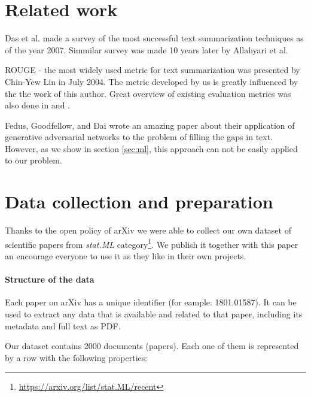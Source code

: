\documentclass[sigplan]{acmart}
\begin{document}

\section{Related work}

Das et al. made a survey of the most successful text summarization techniques as of the year 2007\cite{das-7}. Simmilar survey was made 10 years later by Allahyari et al\cite{allahyari-17}.

ROUGE - the most widely used metric for text summarization was presented by Chin-Yew Lin in July 2004\cite{lin-4}. The metric developed by us is greatly influenced by the the work of this author. Great overview of existing evaluation metrics was also done in \cite{das-7} and \cite{allahyari-17}.

Fedus, Goodfellow, and Dai\cite{fedus-18} wrote an amazing paper about their application of generative adversarial networks to the problem of filling the gaps in text. However, as we show in section \ref{sec:ml}, this approach can not be easily applied to our problem.

\section{Data collection and preparation}
\label{sec:data}

Thanks to the open policy of arXiv we were able to collect our own dataset of scientific papers from \textit{stat.ML} category\footnote{\url{https://arxiv.org/list/stat.ML/recent}}. We publish it together with this paper an encourage everyone to use it as they like in their own projects.

\paragraph{Structure of the data} Each paper on arXiv has a unique identifier (for eample: 1801.01587). It can be used to extract any data that is available and related to that paper, including its metadata and full text as PDF.

Our dataset contains 2000 documents (papers). Each one of them is represented by a row with the following properties:
\end{document}
